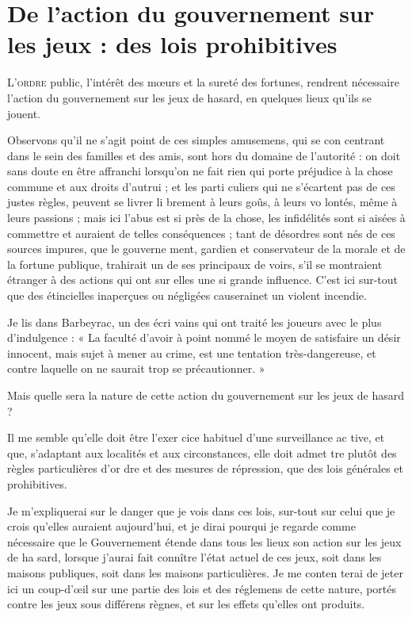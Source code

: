 \chapter{De l'action du gouvernement sur les jeux : des lois prohibitives}

\lettrine{L}{'ordre} public, l'intérêt des m{\oe}urs
et la sureté des fortunes, rendrent
nécessaire l'action du gouvernement
sur les jeux de hasard, en quelques
lieux qu'ils se jouent.

Observons qu'il ne s'agit point de
ces simples amusemens, qui se con%
centrant dans le sein des familles et
des amis, sont hors du domaine de
l'autorité : on doit sans doute en être
affranchi lorsqu'on ne fait rien qui
porte préjudice à la chose commune
et aux droits d'autrui ; et les parti%
culiers qui ne s'écartent pas de ces
justes règles, peuvent se livrer li%
brement à leurs goûs, à leurs vo%
lontés, même à leurs passions ; mais
ici l'abus est si près de la chose, les
infidélités sont si aisées à commettre
et auraient de telles conséquences ;
tant de désordres sont nés de ces
sources impures, que le gouverne%
ment, gardien et conservateur de la 
morale et de la fortune publique,
trahirait un de ses principaux de%
voirs, s'il se montraient étranger à des
actions qui ont sur elles une si grande
influence. C'est ici sur-tout que des
étincielles inaperçues ou négligées
causerainet un violent incendie.

Je lis dans Barbeyrac, un des écri%
vains qui ont traité les joueurs avec
le plus d'indulgence : « La faculté
d'avoir à point nommé le moyen
de satisfaire un désir innocent,
mais sujet à mener au crime, est
une tentation très-dangereuse, et
contre laquelle on ne saurait trop
se précautionner. »

Mais quelle sera la nature de cette
action du gouvernement sur les jeux
de hasard ?

Il me semble qu'elle doit être l'exer%
cice habituel d'une surveillance ac%
tive, et que, s'adaptant aux localités
et aux circonstances, elle doit admet%
tre plutôt des règles particulières d'or%
dre et des mesures de répression, que
des lois générales et prohibitives.

Je m'expliquerai sur le danger que
je vois dans ces lois, sur-tout sur
celui que je crois qu'elles auraient
aujourd'hui, et je dirai pourqui je
regarde comme nécessaire que le
Gouvernement étende dans tous les
lieux son action sur les jeux de ha%
sard, lorsque j'aurai fait connître
l'état actuel de ces jeux, soit dans
les maisons publiques, soit dans les
maisons particulières. Je me conten%
terai de jeter ici un coup-d'{\oe}il sur
une partie des lois et des réglemens
de cette nature, portés contre les jeux
sous différens règnes, et sur les effets
qu'elles ont produits.

